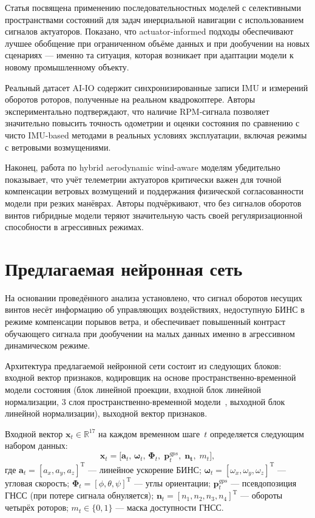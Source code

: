 Статья \cite{ssm_actuator2025} посвящена применению последовательностных моделей с селективными пространствами состояний для задач инерциальной навигации с использованием сигналов актуаторов. Показано, что actuator-informed подходы обеспечивают лучшее обобщение при ограниченном объёме данных и при дообучении на новых сценариях — именно та ситуация, которая возникает при адаптации модели к новому промышленному объекту.

Реальный датасет AI-IO \cite{aiio2026} содержит синхронизированные записи IMU и измерений оборотов роторов, полученные на реальном квадрокоптере. Авторы экспериментально подтверждают, что наличие RPM-сигнала позволяет значительно повысить точность одометрии и оценки состояния по сравнению с чисто IMU-based методами в реальных условиях эксплуатации, включая режимы с ветровыми возмущениями.

Наконец, работа по hybrid aerodynamic wind-aware моделям \cite{hawad2023} убедительно показывает, что учёт телеметрии актуаторов критически важен для точной компенсации ветровых возмущений и поддержания физической согласованности модели при резких манёврах. Авторы подчёркивают, что без сигналов оборотов винтов гибридные модели теряют значительную часть своей регуляризационной способности в агрессивных режимах.


\section{Предлагаемая нейронная сеть}
\label{sec:arch}
На основании проведённого анализа установлено,
что сигнал оборотов несущих винтов несёт информацию об управляющих воздействиях,
недоступную БИНС в режиме компенсации порывов ветра, и обеспечивает повышенный
контраст обучающего сигнала при дообучении на малых данных именно в агрессивном
динамическом режиме.

Архитектура предлагаемой нейронной сети состоит из следующих блоков:
входной вектор признаков, кодировщик на основе пространственно-временной
модели состояния (блок линейной проекции, входной блок линейной нормализации,
3 слоя пространственно-временной модели~\cite{Gu2024}, выходной блок линейной
нормализации), выходной вектор признаков.

Входной вектор $\mathbf{x}_t \in \mathbb{R}^{17}$ на каждом временном
шаге~$t$ определяется следующим набором данных:
\begin{equation}
	\mathbf{x}_t = \bigl[
	\mathbf{a}_t,\,\boldsymbol{\omega}_t,\,
	\boldsymbol{\Phi}_t,\;
	\mathbf{p}^{gps}_t,\;
	\mathbf{n_t},\;
	m_t
	\bigr],
	\label{eq:input}
\end{equation}
где $\mathbf{a}_t = [a_x,a_y,a_z]^{\mathrm{T}}$ --- линейное ускорение БИНС;
$\boldsymbol{\omega}_t = [\omega_x,\omega_y,\omega_z]^{\mathrm{T}}$ ---
угловая скорость; $\boldsymbol{\Phi}_t = [\phi,\theta,\psi]^{\mathrm{T}}$ ---
углы ориентации; $\mathbf{p}^{gps}_t$ --- псевдопозиция ГНСС (при потере
сигнала обнуляется); $\mathbf{n}_t = [n_1,n_2,n_3,n_4]^{\mathrm{T}}$ ---
обороты четырёх роторов; $m_t \in \{0,1\}$ --- маска доступности ГНСС.

